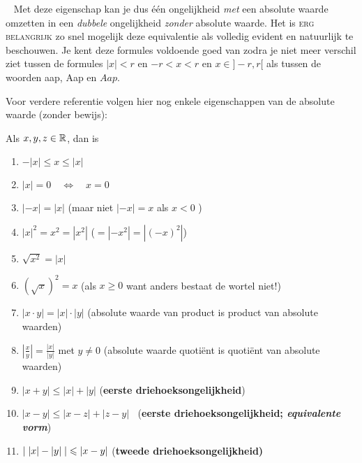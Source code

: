 \documentclass[numbers,wordchoicegiven]{ximera}
\begin{document}

\begin{remark} \  %
		Met deze eigenschap kan je dus één ongelijkheid \textit{met} een absolute waarde omzetten in een \textit{dubbele} ongelijkheid \textit{zonder} absolute waarde. Het is \textsc{erg belangrijk} zo snel mogelijk deze equivalentie als volledig evident en natuurlijk te beschouwen. Je kent deze formules voldoende goed van zodra je niet meer verschil ziet tussen de formules $|x|<r$ en $-r<x<r$ en $x\in]-r,r[$ als tussen de woorden aap, Aap en $Aap$.
\end{remark}

Voor verdere referentie volgen hier nog enkele eigenschappen van de absolute waarde
(zonder bewijs):
\begin{proposition}\label{eig: aw}
	Als $x,y,z\in \mathbb{R}$, dan is
	\begin{enumerate}
		\item \label{aw tss}$-|x| \leqslant x \leqslant |x|$ 
		\item \label{aw 0}$|x|=0 \quad\Leftrightarrow \quad x=0$ 
		\item \label{aw x -x} $|-x|=|x|$ \hfill (maar niet $|-x|=x$ als $x<0$ )
		\item \label{aw kwadr}$|x|^2=x^2=|x^2|$ \hfill ($=|-x^2| = |(-x)^2|$)
		\item \label{wortel	kwadr}$\sqrt{x^2}=|x|$
		\item \label{kwadr wortel}$(\sqrt{x})^2=x$ \hfill(als $x \geq 0$
			want anders bestaat de wortel niet!)
		\item \label{aw product}$|x\cdot y|=|x|\cdot|y|$ \hfill(absolute waarde van product is product van absolute waarden)
		\item \label{aw	quotient}$\displaystyle \left|\frac{x}{y}\right|=\frac{|x|}{|y|}$
		met $y\neq 0$ \hfill(absolute waarde quotiënt is quotiënt van absolute waarden)
			

		\item \label{aw1edrieh}$|x+y| \leqslant|x|+|y|$ \hfill ({\bf eerste
			drie\-hoeks\-on\-ge\-lijk\-heid})
		\item \label{aw1e drieh2}$|x-y|
		\leqslant|x-z|+|z-y|\;\;$ \hfill ({\bf eerste
			drie\-hoeks\-on\-ge\-lijk\-heid;  \textit{equivalente vorm}})
		\item \label{aw 2e drieh} $\displaystyle |\;|x|-|y|\;| \leqslant|x-y|$ \hfill
		(\bf tweede driehoeksongelijkheid)
	\end{enumerate}
\end{proposition}
\end{document}
